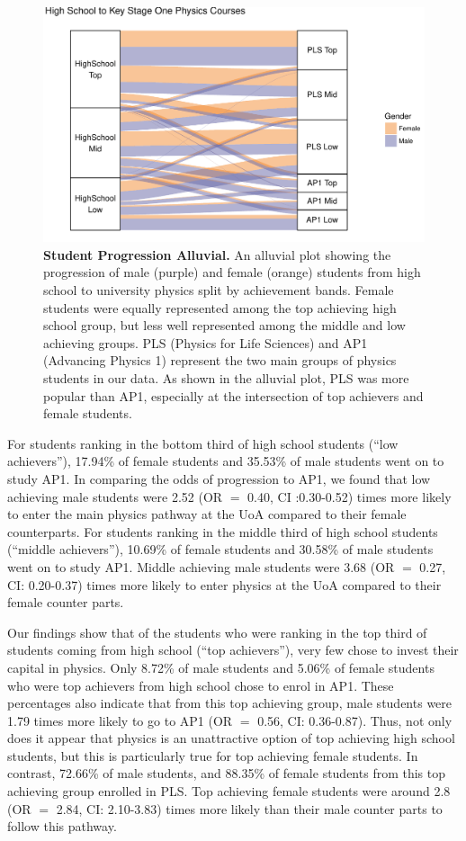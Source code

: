 \begin{figure}[!ht]
\centering
\includegraphics[width = \linewidth]{C3 - Bourdieu Networks/C3 - Fig5.pdf}
\caption{\textbf{Student Progression Alluvial.\newline}
An alluvial plot showing the progression of male (purple) and female (orange) students from high school to university physics split by achievement bands. Female students were equally represented among the top achieving high school group, but less well represented among the middle and low achieving groups. PLS (Physics for Life Sciences) and AP1 (Advancing Physics 1) represent the two main groups of physics students in our data. As shown in the alluvial plot, PLS was more popular than AP1, especially at the intersection of top achievers and female students.}
\label{Fig5} 
\end{figure}

For students ranking in the bottom third of high school students (``low achievers''), 17.94\% of female students and 35.53\% of male students went on to study AP1. In comparing the odds of progression to AP1, we found that low achieving male students were 2.52 (OR $=$ 0.40, CI :0.30-0.52) times more likely to enter the main physics pathway at the UoA compared to their female counterparts. For students ranking in the middle third of high school students (``middle achievers''),  10.69\% of female students and 30.58\% of male students went on to study AP1. Middle achieving male students were 3.68 (OR $=$ 0.27, CI: 0.20-0.37) times more likely to enter physics at the UoA compared to their female counter parts. 

Our findings show that of the students who were ranking in the top third of students coming from high school (``top achievers''), very few chose to invest their capital in physics. Only 8.72\% of male students and 5.06\% of female students who were top achievers from high school chose to enrol in AP1. These percentages also indicate that from this top achieving group, male students were 1.79 times more likely to go to AP1 (OR $=$ 0.56, CI: 0.36-0.87). Thus, not only does it appear that physics is an unattractive option of top achieving high school students, but this is particularly true for top achieving female students. In contrast, 72.66\% of male students, and 88.35\% of female students from this top achieving group enrolled in PLS. Top achieving female students were around 2.8 (OR $=$ 2.84, CI: 2.10-3.83) times more likely than their male counter parts to follow this pathway. 

